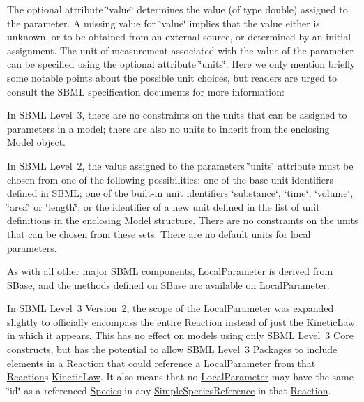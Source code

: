 The optional attribute \char`\"{}value\char`\"{} determines the value (of type {\ttfamily double}) assigned to the parameter. A missing value for \char`\"{}value\char`\"{} implies that the value either is unknown, or to be obtained from an external source, or determined by an initial assignment. The unit of measurement associated with the value of the parameter can be specified using the optional attribute \char`\"{}units\char`\"{}. Here we only mention briefly some notable points about the possible unit choices, but readers are urged to consult the S\+B\+ML specification documents for more information\+: 
\begin{DoxyItemize}
\item In S\+B\+ML Level~3, there are no constraints on the units that can be assigned to parameters in a model; there are also no units to inherit from the enclosing \hyperlink{class_model}{Model} object.


\item In S\+B\+ML Level~2, the value assigned to the parameter\textquotesingle{}s \char`\"{}units\char`\"{} attribute must be chosen from one of the following possibilities\+: one of the base unit identifiers defined in S\+B\+ML; one of the built-\/in unit identifiers {\ttfamily \char`\"{}substance\char`\"{}}, {\ttfamily \char`\"{}time\char`\"{}}, {\ttfamily \char`\"{}volume\char`\"{}}, {\ttfamily \char`\"{}area\char`\"{}} or {\ttfamily \char`\"{}length\char`\"{}}; or the identifier of a new unit defined in the list of unit definitions in the enclosing \hyperlink{class_model}{Model} structure. There are no constraints on the units that can be chosen from these sets. There are no default units for local parameters. 
\end{DoxyItemize}

As with all other major S\+B\+ML components, \hyperlink{class_local_parameter}{Local\+Parameter} is derived from \hyperlink{class_s_base}{S\+Base}, and the methods defined on \hyperlink{class_s_base}{S\+Base} are available on \hyperlink{class_local_parameter}{Local\+Parameter}.

In S\+B\+ML Level~3 Version~2, the scope of the \hyperlink{class_local_parameter}{Local\+Parameter} was expanded slightly to officially encompass the entire \hyperlink{class_reaction}{Reaction} instead of just the \hyperlink{class_kinetic_law}{Kinetic\+Law} in which it appears. This has no effect on models using only S\+B\+ML Level~3 Core constructs, but has the potential to allow S\+B\+ML Level~3 Packages to include elements in a \hyperlink{class_reaction}{Reaction} that could reference a \hyperlink{class_local_parameter}{Local\+Parameter} from that \hyperlink{class_reaction}{Reaction}\textquotesingle{}s \hyperlink{class_kinetic_law}{Kinetic\+Law}. It also means that no \hyperlink{class_local_parameter}{Local\+Parameter} may have the same {\ttfamily \char`\"{}id\char`\"{}} as a referenced \hyperlink{class_species}{Species} in any \hyperlink{class_simple_species_reference}{Simple\+Species\+Reference} in that \hyperlink{class_reaction}{Reaction}.


